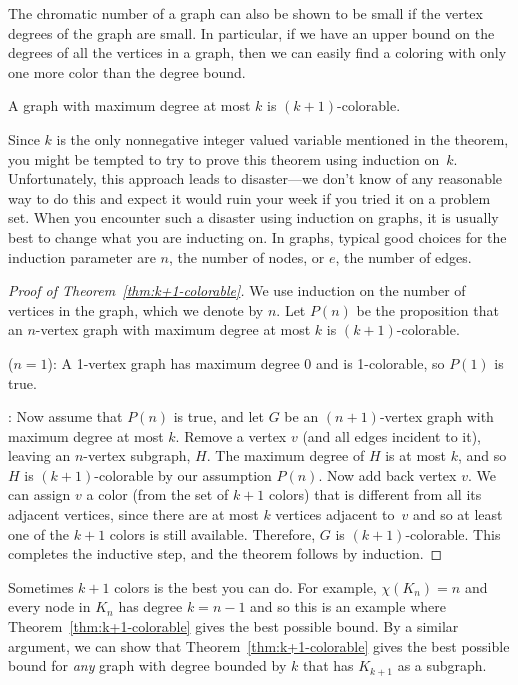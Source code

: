 The chromatic number of a graph can also be shown to be small if the
vertex degrees of the graph are small.  In particular, if we have an
upper bound on the degrees of all the vertices in a graph, then we can
easily find a coloring with only one more color than the degree bound.

\begin{theorem}\label{thm:k+1-colorable}
A graph with maximum degree at most $k$ is $(k+1)$-colorable.
\end{theorem}

Since $k$ is the only nonnegative integer valued variable mentioned in the
theorem, you might be tempted to try to prove this theorem using induction
on~$k$.  Unfortunately, this approach leads to disaster---we don't know of
any reasonable way to do this and expect it would ruin your week if you
tried it on a problem set.  When you encounter such a disaster using
induction on graphs, it is usually best to change what you are inducting
on.  In graphs, typical good choices for the induction parameter are $n$,
the number of nodes, or $e$, the number of edges.

\begin{proof}[Proof of Theorem~\ref{thm:k+1-colorable}]
We use induction on the number of vertices in the graph, which we
denote by $n$.  Let $P(n)$ be the proposition that an $n$-vertex graph
with maximum degree at most $k$ is $(k+1)$-colorable.

 ($n=1$): A 1-vertex graph has maximum degree
0 and is 1-colorable, so $P(1)$ is true.

: Now assume that $P(n)$ is true, and
let $G$ be an $(n+1)$-vertex graph with maximum degree at most $k$.
Remove a vertex $v$ (and all edges incident to it), leaving an
$n$-vertex subgraph, $H$.  The maximum degree of $H$ is at most $k$,
and so $H$ is $(k+1)$-colorable by our assumption $P(n)$.  Now add
back vertex $v$.  We can assign $v$ a color (from the set of $k + 1$
colors) that is different from all its adjacent vertices, since there
are at most $k$ vertices adjacent to~$v$ and so at least one of the
$k+1$ colors is still available.  Therefore, $G$ is $(k+1)$-colorable.
This completes the inductive step, and the theorem follows by
induction.
\end{proof}

Sometimes $k+1$ colors is the best you can do.  For example, $\chi(K_n) = n$
and every node in $K_n$ has degree $k = n - 1$ and so this is an example where
Theorem~\ref{thm:k+1-colorable} gives the best possible bound.  By a
similar argument, we can show that Theorem~\ref{thm:k+1-colorable} gives
the best possible bound for \emph{any} graph with degree bounded by
$k$ that has $K_{k+1}$ as a subgraph.

